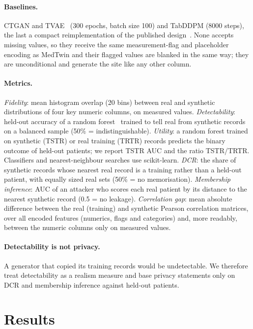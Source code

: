 \documentclass[runningheads]{llncs}
\begin{document}
\paragraph{Baselines.}
CTGAN and TVAE~\cite{xu2019ctgan} (300 epochs, batch size 100) and TabDDPM
(8000 steps), the last a compact reimplementation of the published
design~\cite{kotelnikov2023tabddpm}. None accepts missing values, so they
receive the same measurement-flag and placeholder encoding as MedTwin and
their flagged values are blanked in the same way; they are unconditional
and generate the site like any other column.

\paragraph{Metrics.}
\emph{Fidelity}: mean histogram overlap (20 bins) between real and
synthetic distributions of four key numeric columns, on measured values.
\emph{Detectability}: held-out accuracy of a random forest~\cite{breiman2001rf} trained to tell
real from synthetic records on a balanced sample (50\% = indistinguishable).
\emph{Utility}: a random forest trained on synthetic (TSTR) or real
training (TRTR) records predicts the binary outcome of held-out patients; we
report TSTR AUC and the ratio TSTR/TRTR. Classifiers and nearest-neighbour
searches use scikit-learn. \emph{DCR}: the share of synthetic
records whose nearest real record is a training rather than a held-out
patient, with equally sized real sets (50\% = no memorisation).
\emph{Membership inference}: AUC of an attacker who scores each real patient
by its distance to the nearest synthetic record (0.5 = no leakage).
\emph{Correlation gap}: mean absolute difference between the real
(training) and synthetic Pearson correlation matrices, over all encoded
features (numerics, flags and categories) and, more readably, between the
numeric columns only on measured values.

\paragraph{Detectability is not privacy.}
A generator that copied its training records would be undetectable. We
therefore treat detectability as a realism measure and base privacy
statements only on DCR and membership inference against held-out patients.

\section{Results}
\end{document}

